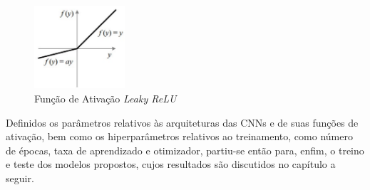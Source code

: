 \begin{figure}[!ht]
     \centering
     \includegraphics[width=0.3\textwidth]{img/lrelu}
     \caption{Função de Ativação \emph{Leaky ReLU}}
     \label{fig:lrelu}
\end{figure}

Definidos os parâmetros relativos às arquiteturas das CNNs e de suas funções de ativação, bem como os hiperparâmetros relativos ao treinamento, como número de épocas, taxa de aprendizado e otimizador, partiu-se então para, enfim, o treino e teste dos modelos propostos, cujos resultados são discutidos no capítulo a seguir.
